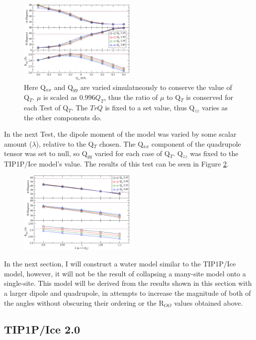 \documentclass[aps, jcp, prl, reprint, groupedaddress, superscriptaddress, twocolumn]{revtex4-1}
\begin{document}
\begin{figure}[h!]
\includegraphics[width=0.5\textwidth]{Test12_plot.pdf}
\caption{\label{fig:Q_T}Here Q$_{xx}$ and Q$_{yy}$ are varied simulatneously to conserve the value of Q$_T$. $\mu$ is scaled as $0.996 Q_T$, thus the ratio of $\mu$ to Q$_T$ is conserved for each Test of Q$_T$. The $TrQ$ is fixed to a set value, thus Q$_{zz}$ varies as the other components do. }
\end{figure}


In the next Test, the dipole moment of the model was varied by some scalar
amount ($\lambda$), relative to the Q$_T$ chosen. The Q$_{xx}$ component
of the quadrupole tensor was set to null, so Q$_{yy}$ varied for each 
case of Q$_T$. Q$_{zz}$ was fixed to the TIP1P/Ice model's value. The
results of this test can be seen in Figure \ref{fig:mew}.

\begin{figure}[h!]
\includegraphics[width=0.5\textwidth]{Test16_plot.pdf}
\caption{\label{fig:mew} }
\end{figure}
In the next section, I will construct a water model similar to the TIP1P/Ice 
model, however, it will not be the result of collapsing a many-site model onto
a single-site. This model will be derived from the results shown in this 
section with a larger dipole and quadrupole, in attempts to increase the 
magnitude of both of the angles without obscuring their ordering or the 
R$_{OO}$ values obtained above.

\subsection{TIP1P/Ice 2.0}
\end{document}
